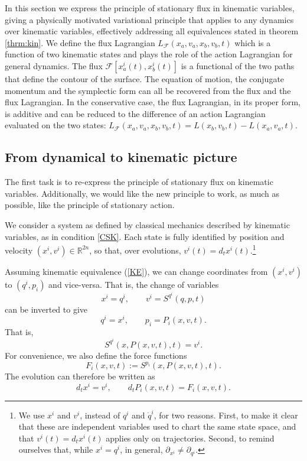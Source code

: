 \documentclass[nofootinbib,aps,pre]{revtex4-2}
\begin{document}
In this section we express the principle of stationary flux in kinematic variables, giving a physically motivated variational principle that applies to any dynamics over kinematic variables, effectively addressing all equivalences stated in theorem \ref{thrm:kin}. We define the flux Lagrangian $L_{\mathcal{F}}(x_a, v_a, x_b, v_b, t)$ which is a function of two kinematic states and plays the role of the action Lagrangian for general dynamics. The flux $\mathcal{F}[x^i_a(t), x^i_b(t)]$ is a functional of the two paths that define the contour of the surface. The equation of motion, the conjugate momentum and the symplectic form can all be recovered from the flux and the flux Lagrangian. In the conservative case, the flux Lagrangian, in its proper form, is additive and can be reduced to the difference of an action Lagrangian evaluated on the two states: $L_{\mathcal{F}}(x_a, v_a, x_b, v_b, t) = L(x_b, v_b, t) - L(x_a, v_a, t)$.

\subsection{From dynamical to kinematic picture}

The first task is to re-express the principle of stationary flux on kinematic variables. Additionally, we would like the new principle to work, as much as possible, like the principle of stationary action.

We consider a system as defined by classical mechanics described by kinematic variables, as in condition \ref{CSK}. Each state is fully identified by position and velocity $(x^i, v^i) \in \mathbb{R}^{2n}$, so that, over evolutions, $v^i (t) = d_t x^i(t)$.\footnote{We use $x^i$ and $v^i$, instead of $q^i$ and $\dot{q}^i$, for two reasons. First, to make it clear that these are independent variables used to chart the same state space, and that $v^i (t) = d_t x^i(t)$ applies only on trajectories. Second, to remind ourselves that, while $x^i = q^i$, in general, $\partial_{x^i} \neq \partial_{q^i}$.}

Assuming kinematic equivalence (\ref{KE}), we can change coordinates from $(x^i, v^i)$ to $(q^i, p_i)$ and vice-versa. That is, the change of variables
\begin{equation}
	x^i=q^i,
	\qquad
	v^i=S^{q^i}(q,p,t)
\end{equation}
can be inverted to give
\begin{equation}
	q^i=x^i,
	\qquad
	p_i=P_i(x,v,t).
\end{equation}
That is,
\begin{equation}
	S^{q^i}(x,P(x,v,t),t)=v^i.
\end{equation}
For convenience, we also define the force functions
\begin{equation}
	F_i(x,v,t):=S^{p_i}(x,P(x,v,t),t).
\end{equation}
The evolution can therefore be written as
\begin{equation}\label{eq:kinematicEvolution}
	d_t x^i=v^i,
	\qquad
	d_tP_i(x,v,t)=F_i(x,v,t).
\end{equation}
\end{document}
